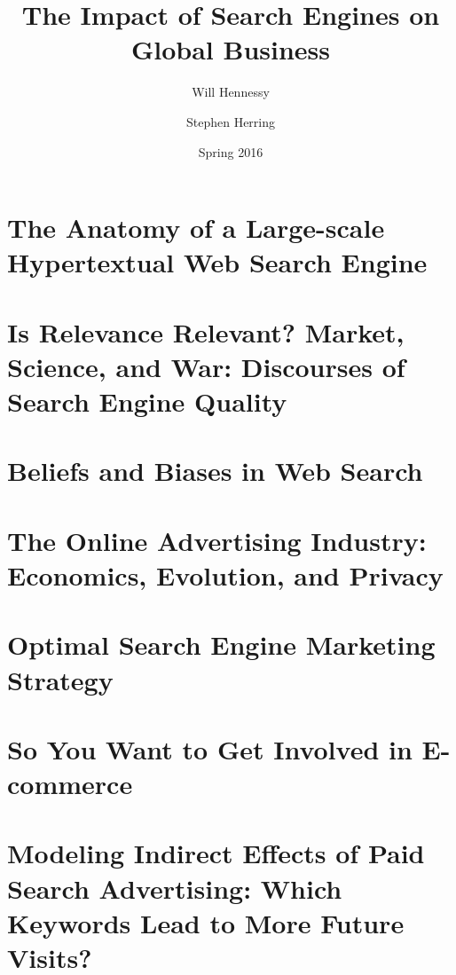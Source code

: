 \documentclass[11pt]{article}
\title{The Impact of Search Engines on Global Business}
\author{Will Hennessy \and Stephen Herring}
\date{Spring 2016}
\begin{document}
\maketitle

\thispagestyle{empty}

\setcounter{tocdepth}{1} %

\tableofcontents

\newpage

\clearpage
\setcounter{page}{1}

\section{The Anatomy of a Large-scale Hypertextual Web Search Engine}

\newpage

\section{Is Relevance Relevant? Market, Science, and War:  Discourses of Search Engine Quality}

\newpage

\section{Beliefs and Biases in Web Search}

\newpage

\section{The Online Advertising Industry: Economics, Evolution, and Privacy}

\newpage

\section{Optimal Search Engine Marketing Strategy}

\newpage

\section{So You Want to Get Involved in E-commerce}

\newpage

\section{Modeling Indirect Effects of Paid Search Advertising: Which Keywords Lead to More Future Visits?}

\newpage
\end{document}
